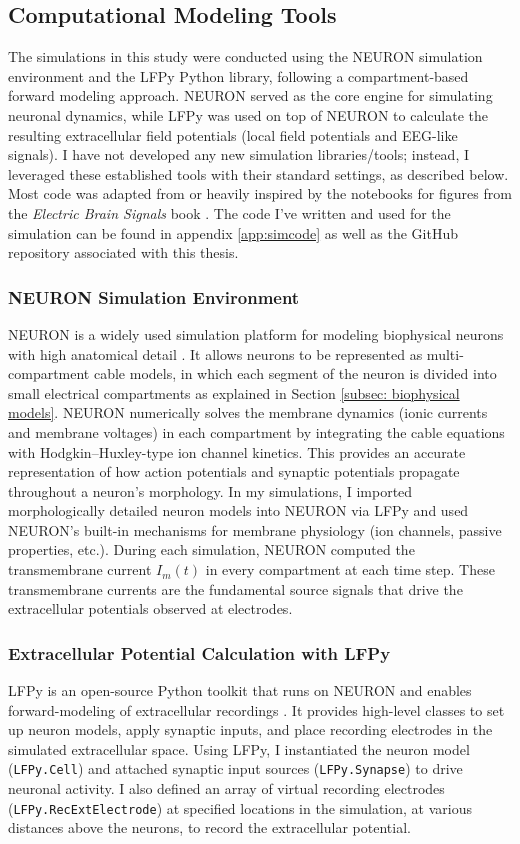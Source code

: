 \documentclass[final, a4paper,masters,en,listoffigures,listoftables,norwegiandates]{NMBU}
\begin{document}
\subsection{Computational Modeling Tools}

The simulations in this study were conducted using the NEURON simulation environment and the LFPy Python library, following a compartment-based forward modeling approach. NEURON served as the core engine for simulating neuronal dynamics, while LFPy was used on top of NEURON to calculate the resulting extracellular field potentials (local field potentials and EEG-like signals). I have not developed any new simulation libraries/tools; instead, I leveraged these established tools with their standard settings, as described below. Most code was adapted from or heavily inspired by the notebooks for figures from the \textit{Electric Brain Signals} book \cite{Halnes2024ElectricBrainSignals}. The code I've written and used for the simulation can be found in appendix \ref{app:simcode} as well as the GitHub repository associated with this thesis.

\subsubsection{NEURON Simulation Environment}
NEURON is a widely used simulation platform for modeling biophysical neurons with high anatomical detail \cite{Hines1997}. It allows neurons to be represented as multi-compartment cable models, in which each segment of the neuron is divided into small electrical compartments as explained in Section \ref{subsec: biophysical models}. NEURON numerically solves the membrane dynamics (ionic currents and membrane voltages) in each compartment by integrating the cable equations with Hodgkin--Huxley-type ion channel kinetics. This provides an accurate representation of how action potentials and synaptic potentials propagate throughout a neuron’s morphology. In my simulations, I imported morphologically detailed neuron models into NEURON via LFPy and used NEURON’s built-in mechanisms for membrane physiology (ion channels, passive properties, etc.). During each simulation, NEURON computed the transmembrane current $I_m(t)$ in every compartment at each time step. These transmembrane currents are the fundamental source signals that drive the extracellular potentials observed at electrodes.

\subsubsection{Extracellular Potential Calculation with LFPy}
LFPy is an open-source Python toolkit that runs on NEURON and enables forward-modeling of extracellular recordings \cite{Linden2014}. It provides high-level classes to set up neuron models, apply synaptic inputs, and place recording electrodes in the simulated extracellular space. Using LFPy, I instantiated the neuron model (\texttt{LFPy.Cell}) and attached synaptic input sources (\texttt{LFPy.Synapse}) to drive neuronal activity. I also defined an array of virtual recording electrodes (\texttt{LFPy.RecExtElectrode}) at specified locations in the simulation, at various distances above the neurons, to record the extracellular potential.
\end{document}
